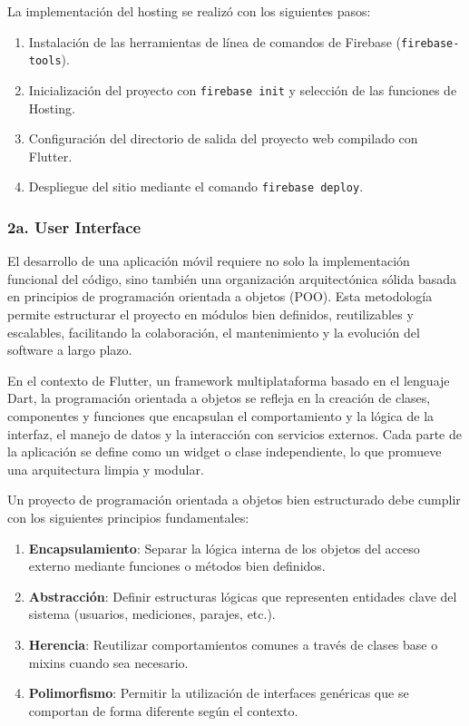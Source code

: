 La implementación del hosting se realizó con los siguientes pasos:

\begin{enumerate}
    \item Instalación de las herramientas de línea de comandos de Firebase (\texttt{firebase-tools}).
    \item Inicialización del proyecto con \texttt{firebase init} y selección de las funciones de Hosting.
    \item Configuración del directorio de salida del proyecto web compilado con Flutter.
    \item Despliegue del sitio mediante el comando \texttt{firebase deploy}.
\end{enumerate}

\subsubsection{2a. User Interface}

El desarrollo de una aplicación móvil requiere no solo la implementación funcional del código, sino también una organización arquitectónica sólida basada en principios de programación orientada a objetos (POO). Esta metodología permite estructurar el proyecto en módulos bien definidos, reutilizables y escalables, facilitando la colaboración, el mantenimiento y la evolución del software a largo plazo.

En el contexto de Flutter, un framework multiplataforma basado en el lenguaje Dart, la programación orientada a objetos se refleja en la creación de clases, componentes y funciones que encapsulan el comportamiento y la lógica de la interfaz, el manejo de datos y la interacción con servicios externos. Cada parte de la aplicación se define como un widget o clase independiente, lo que promueve una arquitectura limpia y modular.

Un proyecto de programación orientada a objetos bien estructurado debe cumplir con los siguientes principios fundamentales:

\begin{enumerate}
    \item \textbf{Encapsulamiento}: Separar la lógica interna de los objetos del acceso externo mediante funciones o métodos bien definidos.
    \item \textbf{Abstracción}: Definir estructuras lógicas que representen entidades clave del sistema (usuarios, mediciones, parajes, etc.).
    \item \textbf{Herencia}: Reutilizar comportamientos comunes a través de clases base o mixins cuando sea necesario.
    \item \textbf{Polimorfismo}: Permitir la utilización de interfaces genéricas que se comportan de forma diferente según el contexto.
\end{enumerate}



